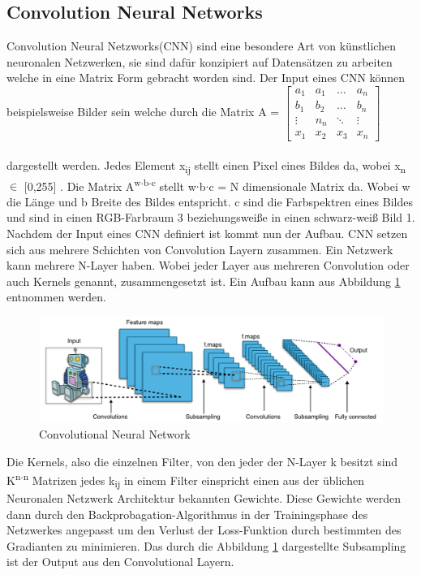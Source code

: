 \documentclass{llncs}
\begin{document}
\subsection{Convolution Neural Networks}

Convolution Neural Netzworks(CNN) sind eine besondere Art von künstlichen neuronalen Netzwerken, sie sind dafür konzipiert auf Datensätzen zu arbeiten welche in eine Matrix Form gebracht worden sind. Der Input eines CNN können beispielsweise Bilder sein welche durch die Matrix A =
$
\begin{bmatrix}
a_1	& a_1	& \dots	 & a_n     \\
b_1	& b_2 	& \dots  & b_n	  \\
\vdots	& n_n 	& \ddots & \vdots \\
x_1 	& x_2 & x_3	 & x_n
\end{bmatrix}
$
\\\\dargestellt werden. Jedes Element x\textsubscript{ij} stellt einen Pixel eines Bildes da, wobei x\textsubscript{n} $\in$ [0,255] . Die Matrix A\textsuperscript{w$\cdot$b$\cdot$c} stellt w$\cdot$b$\cdot$c = N dimensionale Matrix da. Wobei w die Länge und b Breite des Bildes entspricht. c sind die Farbspektren eines Bildes und sind in einen RGB-Farbraum 3 beziehungsweiße in einen schwarz-weiß Bild 1. Nachdem  der Input eines CNN definiert ist kommt nun der Aufbau. CNN setzen sich aus mehrere Schichten von Convolution Layern zusammen. Ein Netzwerk kann mehrere N-Layer haben. Wobei jeder Layer aus mehreren Convolution oder auch Kernels genannt, zusammengesetzt ist. Ein Aufbau kann aus Abbildung \ref{fig:Bild2} entnommen werden\cite{Grundlagen}.

\begin{figure}[htbp] 
	\centering
	\includegraphics[width=1.0\textwidth]{convol.png}
	\caption{Convolutional Neural Network}
	\label{fig:Bild2}
\end{figure}

Die Kernels, also die einzelnen Filter, von den jeder der N-Layer k besitzt sind K\textsuperscript{n$\cdot$n} Matrizen jedes k\textsubscript{ij} in einem Filter einspricht einen aus der üblichen Neuronalen Netzwerk Architektur bekannten Gewichte. Diese Gewichte werden dann durch den Backprobagation-Algorithmus in der Trainingsphase des Netzwerkes angepasst um den Verlust der Loss-Funktion durch bestimmten des Gradianten zu minimieren. Das durch die Abbildung \ref{fig:Bild2} dargestellte Subsampling ist der Output aus den Convolutional Layern\cite{Grundlagen}. 
\end{document}
